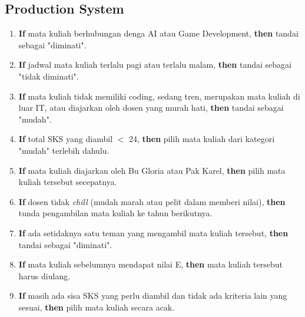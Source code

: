 \documentclass{article}
\begin{document}
\subsection{Production System}
\begin{enumerate}
    \item \textbf{If} mata kuliah berhubungan denga AI atau Game Development, \textbf{then} tandai sebagai "diminati".
    \item \textbf{If} jadwal mata kuliah terlalu pagi atau terlalu malam, \textbf{then} tandai sebagai "tidak diminati".
    \item \textbf{If} mata kuliah tidak memiliki coding, sedang tren, merupakan mata kuliah di luar IT, atau diajarkan oleh dosen yang murah hati, \textbf{then} tandai sebagai "mudah".
    \item \textbf{If} total SKS yang diambil $<$ 24, \textbf{then} pilih mata kuliah dari kategori "mudah" terlebih dahulu.
    \item \textbf{If} mata kuliah diajarkan oleh Bu Gloria atau Pak Karel, \textbf{then} pilih mata kuliah tersebut secepatnya.
    \item \textbf{If} dosen tidak \emph{chill} (mudah marah atau pelit dalam memberi nilai), \textbf{then} tunda pengambilan mata kuliah ke tahun berikutnya.
    \item \textbf{If} ada setidaknya satu teman yang mengambil mata kuliah tersebut, \textbf{then} tandai sebagai "diminati".
    \item \textbf{If} mata kuliah sebelumnya mendapat nilai E, \textbf{then} mata kuliah tersebut harus diulang.
    \item \textbf{If} masih ada sisa SKS yang perlu diambil dan tidak ada kriteria lain yang sesuai, \textbf{then} pilih mata kuliah secara acak.
\end{enumerate}


\vfill
\end{document}
